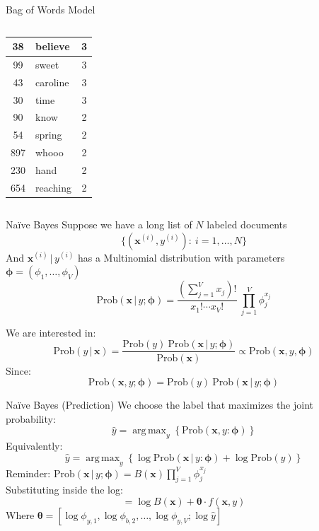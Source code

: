 \documentclass[9pt]{beamer}
\newcommand{\Prob}{\text{Prob}}
\newcommand{\bx}{\mathbf{x}}
\newcommand{\bphi}{\pmb{\phi}}
\newcommand{\btheta}{\pmb{\theta}}
\newcommand{\given}{\, | \,}
\DeclareMathOperator*{\argmax}{arg\,max}
\begin{document}
\begin{frame}{Bag of Words Model}
\begin{columns}[T]
\begin{column}{0.4\textwidth}
\begin{tabular}{|c|l|c|}
                \hline
                38 & believe&3\\
                \hline
                99 & sweet&3\\
                \hline
                43 & caroline&3\\
                \hline
                30 & time&3\\
                \hline
                90 &know&2\\
                \hline
                54& spring&2\\
                \hline
                897& whooo&2\\
                \hline
                230 & hand&2\\
                \hline
                654 & reaching&2\\
                \hline
            \end{tabular}
        \end{column}
    \end{columns}
\end{frame}

\begin{frame}{Na\"ive Bayes}
    Suppose we have a long list of $N$ labeled documents $$\{(\bx^{(i)},y^{(i)}) :\ i = 1,\ldots, N \}$$
        And $\bx^{(i)}\given y^{(i)} $ has a Multinomial distribution with parameters $\bphi = (\phi_1,\ldots, \phi_V)$ 
        $$\Prob(\bx\given y;\bphi) = \frac{(\sum_{j=1}^V x_j)!}{x_1!\cdots x_V!}\  \prod_{j=1}^V \phi_j^{x_j}$$

        We are interested in:
        $$\Prob(y\given \bx) = \frac{\Prob(y)\  \Prob(\bx \given y; \bphi)}{\Prob(\bx)}\propto \Prob(\bx, y,\bphi)$$
        Since:
        $$\Prob(\bx,y; \bphi) = \Prob(y) \ \Prob(\bx \given y; \bphi)$$

\end{frame}


\begin{frame}{Na\"ive Bayes (Prediction)}
     We choose the label that maximizes the joint probability:
     $$\hat y = \argmax_y\left\{ \Prob(\bx, y: \bphi)\right \}$$
     Equivalently:
     $$\hat y = \argmax_y\left\{ \log \Prob(\bx\given y: \bphi) + \log\Prob(y)\right\}$$
     {\color{green}Reminder:} $\displaystyle \Prob(\bx\given y;\bphi) = B(\bx) \prod_{j=1}^V \phi_j^{x_j}$\\
     Substituting inside the log:
     $$= \log B(\bx) + \btheta\cdot f(\bx, y)$$
    Where $\btheta = [\log \phi_{y,1}, \log \phi_{b,2} ,\ldots , \log \phi_{y,V}; \log \hat y]$
\end{frame}
\end{document}
